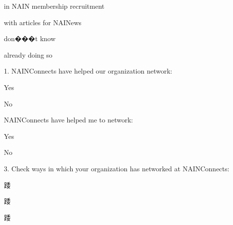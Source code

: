 \documentclass{article}
\begin{document}
in NAIN membership recruitment
 \immediate{} 
\addtocounter{sub_item}{1}   
  
with articles for NAINews 
 \immediate{} 
\addtocounter{sub_item}{1}   
  
don���t know
 \immediate{} 
\addtocounter{sub_item}{1}   
  
already doing so
 \immediate{} 
 
  
%
%
 \setcounter{sub_item}{0}
\immediate{} 
  
1. NAINConnects have helped our organization network: 
 
\addtocounter{sub_item}{1}   
  
Yes
 \immediate{} 
\addtocounter{sub_item}{1}   
  
No
 \immediate{} 
 
  
%
%
 \setcounter{sub_item}{0}
\immediate{} 
  
NAINConnects have helped me to network:
 
\addtocounter{sub_item}{1}   
  
Yes
 \immediate{} 
\addtocounter{sub_item}{1}   
  
No
 \immediate{} 
 
  
%
%
 \setcounter{sub_item}{0}
\immediate{} 
  
3. Check ways in which your organization has networked at NAINConnects:
 
\addtocounter{sub_item}{1}   

踒 
 \immediate{} 
\addtocounter{sub_item}{1}   

踒 
 \immediate{} 
\addtocounter{sub_item}{1}   

踒 
 \immediate{} 
\addtocounter{sub_item}{1}   
\end{document}

